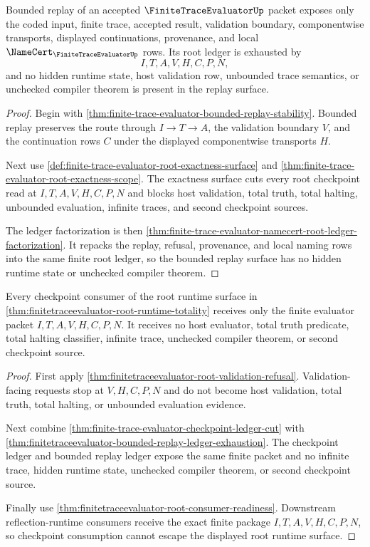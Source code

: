\begin{theorem}
\label{thm:finitetraceevaluator-bounded-replay-ledger-exhaustion}
Bounded replay of an accepted $\FiniteTraceEvaluatorUp$ packet exposes only the coded input, finite trace, accepted result, validation boundary, componentwise transports, displayed continuations, provenance, and local $\NameCert_{\FiniteTraceEvaluatorUp}$ rows. Its root ledger is exhausted by
$$
I,T,A,V,H,C,P,N,
$$
and no hidden runtime state, host validation row, unbounded trace semantics, or unchecked compiler theorem is present in the replay surface.
\end{theorem}
\begin{proof}
Begin with \autoref{thm:finite-trace-evaluator-bounded-replay-stability}. Bounded replay preserves the route through $I \to T \to A$, the validation boundary $V$, and the continuation rows $C$ under the displayed componentwise transports $H$.

Next use \autoref{def:finite-trace-evaluator-root-exactness-surface} and \autoref{thm:finite-trace-evaluator-root-exactness-scope}. The exactness surface cuts every root checkpoint read at $I,T,A,V,H,C,P,N$ and blocks host validation, total truth, total halting, unbounded evaluation, infinite traces, and second checkpoint sources.

The ledger factorization is then \autoref{thm:finite-trace-evaluator-namecert-root-ledger-factorization}. It repacks the replay, refusal, provenance, and local naming rows into the same finite root ledger, so the bounded replay surface has no hidden runtime state or unchecked compiler theorem.
\end{proof}

\begin{theorem}
\label{thm:finitetraceevaluator-checkpoint-consumer-nonescape}
Every checkpoint consumer of the root runtime surface in \autoref{thm:finitetraceevaluator-root-runtime-totality} receives only the finite evaluator packet $I,T,A,V,H,C,P,N$. It receives no host evaluator, total truth predicate, total halting classifier, infinite trace, unchecked compiler theorem, or second checkpoint source.
\end{theorem}
\begin{proof}
First apply \autoref{thm:finitetraceevaluator-root-validation-refusal}. Validation-facing requests stop at $V,H,C,P,N$ and do not become host validation, total truth, total halting, or unbounded evaluation evidence.

Next combine \autoref{thm:finite-trace-evaluator-checkpoint-ledger-cut} with \autoref{thm:finitetraceevaluator-bounded-replay-ledger-exhaustion}. The checkpoint ledger and bounded replay ledger expose the same finite packet and no infinite trace, hidden runtime state, unchecked compiler theorem, or second checkpoint source.

Finally use \autoref{thm:finitetraceevaluator-root-consumer-readiness}. Downstream reflection-runtime consumers receive the exact finite package $I,T,A,V,H,C,P,N$, so checkpoint consumption cannot escape the displayed root runtime surface.
\end{proof}
